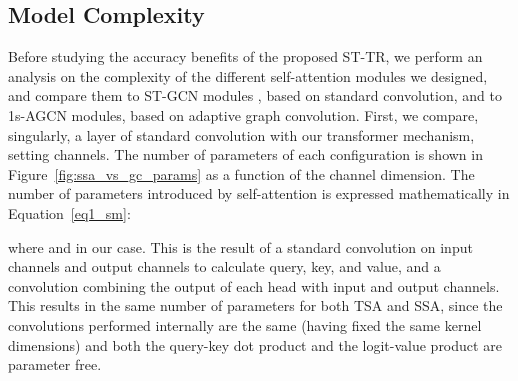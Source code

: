 \documentclass[review]{cvpr}
\begin{document}
\subsection{Model Complexity}\label{sec:complexity}
Before studying the accuracy benefits of the proposed ST-TR, we perform an analysis on the complexity of the different self-attention modules we designed, and compare them to ST-GCN modules \cite{yan2018spatial}, based on standard convolution, and to 1s-AGCN \cite{Shi2018TwoStreamAG} modules, based on adaptive graph convolution. 
First, we compare, singularly, a layer of standard convolution with our transformer mechanism, setting  channels. The number of parameters of each configuration is shown in Figure~\ref{fig:ssa_vs_gc_params} as a function of the channel dimension.
The number of parameters introduced by self-attention is expressed mathematically in Equation~\ref{eq1_sm}:

where  and  in our case. This is the result of a  standard  convolution on  input channels and  output channels to calculate query, key, and value, and a   convolution combining the output of each head with  input and output channels. This results in the same number of parameters for both TSA and SSA, since the convolutions performed internally are the same (having fixed the same kernel dimensions) and both the query-key dot product and the logit-value product are parameter free.
\end{document}
